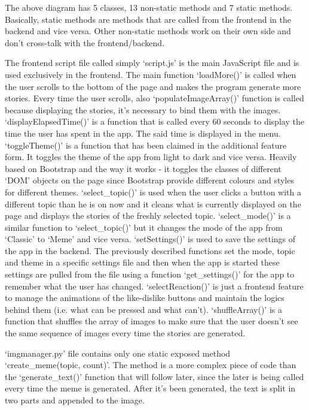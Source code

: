 \documentclass[12pt]{report}
\begin{document}
\begin{appendices}
The above diagram has 5 classes, 13 non-static methods and 7 static methods. Basically, static methods are methods
that are called from the frontend in the backend and vice versa. Other non-static methods work on their own side and don't cross-talk with
the frontend/backend.

The frontend script file called simply `script.js' is the main JavaScript file and is used exclusively in the frontend.
The main function `loadMore()' is called when the user scrolls to the bottom of the page and makes the program generate
more stories. Every time the user scrolls, also `populateImageArray()' function is called because displaying the stories,
it's necessary to bind them with the images. `displayElapsedTime()' is a function that is called every 60 seconds to display
the time the user has spent in the app. The said time is displayed in the menu. `toggleTheme()' is a function that has
been claimed in the additional feature form. It toggles the theme of the app from light to dark and vice versa. Heavily based
on Bootstrap and the way it works - it toggles the classes of different `DOM' objects on the page since Bootstrap
provide different colours and styles for different themes. `select\_topic()' is used when the user clicks a button with a different
topic than he is on now and it cleans what is currently displayed on the page and displays the stories of the freshly selected topic.
`select\_mode()' is a similar function to `select\_topic()' but it changes the mode of the app from `Classic' to `Meme' and vice versa.
`setSettings()' is used to save the settings of the app in the backend. The previously described functions set the mode, topic and theme in
a specific settings file and then when the app is started these settings are pulled from the file using a function `get\_settings()'
for the app to remember what the user has changed. `selectReaction()' is just a frontend feature to manage the animations
of the like-dislike buttons and maintain the logics behind them (i.e. what can be pressed and what can't). `shuffleArray()'
is a function that shuffles the array of images to make sure that the user doesn't see the same sequence of images every time
the stories are generated.

`imgmanager.py' file contains only one static exposed method `create\_meme(topic, count)'. The method is a more complex piece of code
than the `generate\_text()' function that will follow later, since the later is being called every time the meme is generated.
After it's been generated, the text is split in two parts and appended to the image.


\end{appendices}
\end{document}

